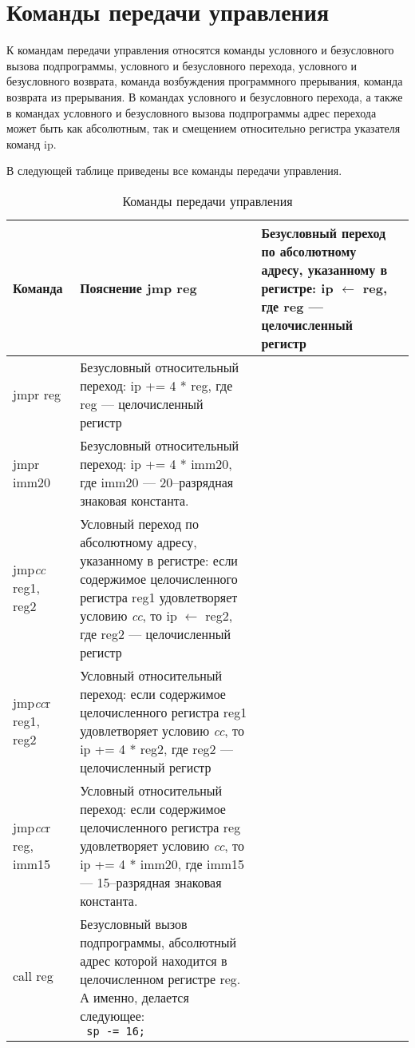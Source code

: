 \documentclass[10pt]{report}
\begin{document}
    \section{Команды передачи управления}
К командам передачи управления относятся команды условного и безусловного вызова подпрограммы, условного и безусловного перехода, условного и безусловного возврата, команда возбуждения программного прерывания, команда возврата из прерывания. В командах условного и безусловного перехода, а также в командах условного и безусловного вызова подпрограммы адрес перехода может быть как абсолютным, так и смещением относительно регистра указателя команд ip.

В следующей таблице приведены все команды передачи управления. 
\begin{longtable}[c]{|l|p{12.5cm}|}
\caption{Команды передачи управления} \\ \hline
{\textbf{Команда}}           & \textbf{Пояснение} \endhead \hline 
jmp reg                      & Безусловный переход по абсолютному адресу, указанному в регистре: ip $\leftarrow$ reg, где reg --- целочисленный регистр \\ \hline
jmpr reg                     & Безусловный относительный переход: ip += 4 * reg, где reg --- целочисленный регистр\\ \hline
jmpr imm20                   & Безусловный относительный переход: ip += 4 * imm20, где imm20 --- 20--разрядная знаковая константа. \\ \hline
jmp\textit{cc} reg1, reg2    & Условный переход по абсолютному адресу, указанному в регистре: если содержимое целочисленного регистра reg1 удовлетворяет условию \textit{cc}, то ip $\leftarrow$ reg2, где reg2 --- целочисленный регистр \\ \hline
jmp\textit{cc}r reg1, reg2   & Условный относительный переход: если содержимое целочисленного регистра reg1 удовлетворяет условию \textit{cc}, то ip += 4 * reg2, где reg2 --- целочисленный регистр\\ \hline
jmp\textit{cc}r reg, imm15   & Условный относительный переход: если содержимое целочисленного регистра reg удовлетворяет условию \textit{cc}, то ip += 4 * imm20, где imm15 --- 15--разрядная знаковая константа. \\ \hline
call reg                     & {\parbox{12.4cm}{Безусловный вызов подпрограммы, абсолютный адрес которой находится в целочисленном регистре reg. А именно, делается следующее:\\ %
\texttt{%
\phantom{aaaa}sp -= 16;\\
}}}
\end{longtable}
\end{document}
